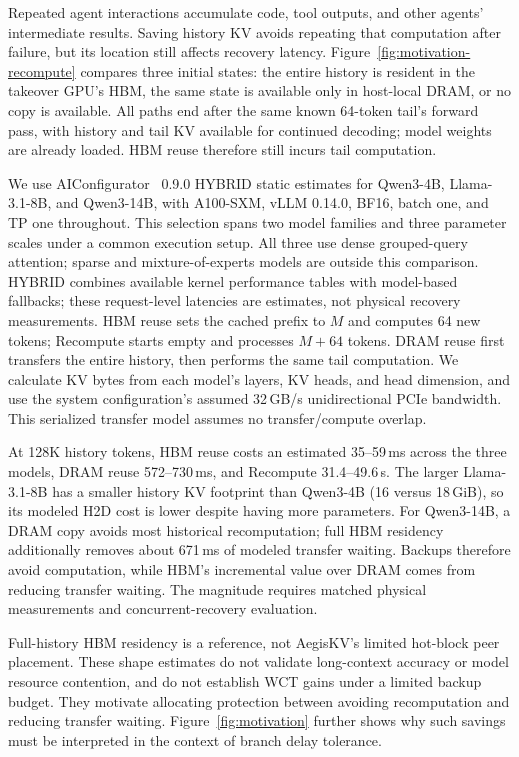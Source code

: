 

Repeated agent interactions accumulate code, tool outputs, and other
agents' intermediate results. Saving history KV avoids repeating that
computation after failure, but its location still affects recovery
latency. Figure~\ref{fig:motivation-recompute} compares three initial
states: the entire history is resident in the takeover GPU's HBM, the
same state is available only in host-local DRAM, or no copy is available.
All paths end after the same known 64-token tail's forward pass, with
history and tail KV available for continued decoding; model weights are
already loaded. HBM reuse therefore still incurs tail computation.

We use AIConfigurator~\cite{nvidia2026aiconfigurator} 0.9.0 HYBRID static
estimates for Qwen3-4B, Llama-3.1-8B, and Qwen3-14B, with A100-SXM,
vLLM 0.14.0, BF16, batch one, and TP one throughout. This selection spans
two model families and three parameter scales under a common execution
setup. All three use dense grouped-query attention; sparse and
mixture-of-experts models are outside this comparison.
HYBRID combines available kernel
performance tables with model-based fallbacks; these request-level
latencies are estimates, not physical recovery measurements. HBM reuse
sets the cached prefix to $M$ and computes 64 new tokens; Recompute
starts empty and processes $M+64$ tokens. DRAM reuse first transfers the
entire history, then performs the same tail computation. We calculate
KV bytes from each model's layers, KV heads, and head dimension, and use
the system configuration's assumed 32\,GB/s unidirectional PCIe bandwidth.
This serialized transfer model assumes no transfer/compute overlap.

At 128K history tokens, HBM reuse costs an estimated 35--59\,ms across
the three models, DRAM reuse 572--730\,ms, and Recompute 31.4--49.6\,s.
The larger Llama-3.1-8B has a smaller history KV footprint than Qwen3-4B
(16 versus 18\,GiB), so its modeled H2D cost is lower despite having
more parameters.
For Qwen3-14B, a DRAM copy avoids most historical recomputation; full
HBM residency additionally removes about 671\,ms of modeled transfer
waiting. Backups therefore avoid computation, while HBM's incremental
value over DRAM comes from reducing transfer waiting. The magnitude
requires matched physical measurements and concurrent-recovery evaluation.

Full-history HBM residency is a reference, not AegisKV's limited hot-block
peer placement. These shape estimates do not validate long-context
accuracy or model resource contention, and do not establish WCT gains
under a limited backup budget. They motivate allocating protection
between avoiding recomputation and reducing transfer waiting.
Figure~\ref{fig:motivation} further shows why such savings must be
interpreted in the context of branch delay tolerance.

